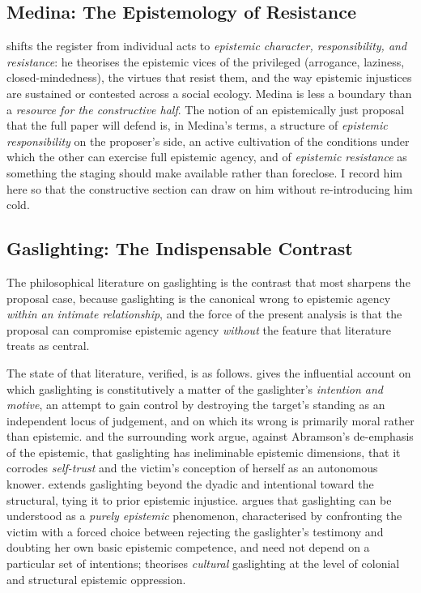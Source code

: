\documentclass[11pt,a4paper]{article}
\begin{document}
\subsection{Medina: The Epistemology of Resistance}

\textcite{medina2013epistemology} shifts the register from individual acts to \emph{epistemic character, responsibility, and resistance}: he theorises the epistemic vices of the privileged (arrogance, laziness, closed-mindedness), the virtues that resist them, and the way epistemic injustices are sustained or contested across a social ecology. Medina is less a boundary than a \emph{resource for the constructive half}. The notion of an epistemically just proposal that the full paper will defend is, in Medina's terms, a structure of \emph{epistemic responsibility} on the proposer's side, an active cultivation of the conditions under which the other can exercise full epistemic agency, and of \emph{epistemic resistance} as something the staging should make available rather than foreclose. I record him here so that the constructive section can draw on him without re-introducing him cold.

\subsection{Gaslighting: The Indispensable Contrast}

The philosophical literature on gaslighting is the contrast that most sharpens the proposal case, because gaslighting is the canonical wrong to epistemic agency \emph{within an intimate relationship}, and the force of the present analysis is that the proposal can compromise epistemic agency \emph{without} the feature that literature treats as central.

The state of that literature, verified, is as follows. \textcite{abramson2014turning} gives the influential account on which gaslighting is constitutively a matter of the gaslighter's \emph{intention and motive}, an attempt to gain control by destroying the target's standing as an independent locus of judgement, and on which its wrong is primarily moral rather than epistemic. \textcite{spear2019epistemic} and the surrounding work argue, against Abramson's de-emphasis of the epistemic, that gaslighting has ineliminable epistemic dimensions, that it corrodes \emph{self-trust} and the victim's conception of herself as an autonomous knower. \textcite{stark2019gaslighting} extends gaslighting beyond the dyadic and intentional toward the structural, tying it to prior epistemic injustice. \textcite{podosky2021gaslighting} argues that gaslighting can be understood as a \emph{purely epistemic} phenomenon, characterised by confronting the victim with a forced choice between rejecting the gaslighter's testimony and doubting her own basic epistemic competence, and need not depend on a particular set of intentions; \textcite{ruiz2020cultural} theorises \emph{cultural} gaslighting at the level of colonial and structural epistemic oppression.
\end{document}
